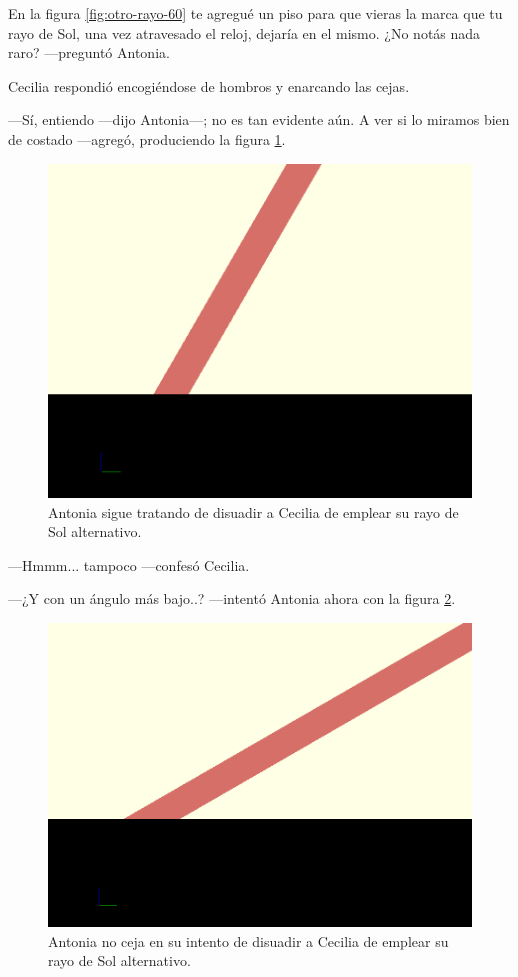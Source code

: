\guillemotright En la figura \ref{fig:otro-rayo-60} te agregué un piso
para que vieras la marca que tu rayo de Sol, una vez atravesado el
reloj, dejaría en el mismo. ¿No notás nada raro? ---preguntó Antonia.

Cecilia respondió encogiéndose de hombros y enarcando las cejas.

---Sí, entiendo ---dijo Antonia---; no es tan evidente aún. A ver si
lo miramos bien de costado ---agregó, produciendo la figura
\ref{fig:otro-rayo-60-perfil}.

\begin{figure}[ht]
  \centering
    \includegraphics[width=.5\textwidth]{imagenes/otro-rayo-60-perfil}
    \caption[Rayo de Sol alternativo III]{Antonia sigue tratando de
      disuadir a Cecilia de emplear su rayo de Sol alternativo.}
    \label{fig:otro-rayo-60-perfil}
  \end{figure}


  ---Hmmm... tampoco ---confesó Cecilia.

  ---¿Y con un ángulo más bajo..? ---intentó Antonia ahora con la
  figura \ref{fig:otro-rayo-30}.


  \begin{figure}[ht]
  \centering
    \includegraphics[width=.5\textwidth]{imagenes/otro-rayo-30}
    \caption[Rayo de Sol alternativo IV]{Antonia no ceja en su intento
      de disuadir a Cecilia de emplear su rayo de Sol alternativo.}
\label{fig:otro-rayo-30}
\end{figure}



